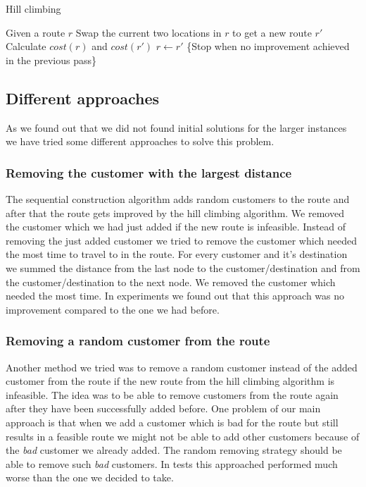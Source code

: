 \documentclass[fleqn]{scrartcl}
\begin{document}
\begin{algorithm}
\caption{Hill climbing}
\label{algo:hillclimb}
\begin{algorithmic}[1]
\State Given a route $r$
\Repeat
{}
\State Swap the current two locations in $r$ to get a new route $r'$
\State Calculate $cost(r)$ and $cost(r')$
\State $r \gets r'$
\EndIf
\EndIf
\EndFor
{} \{Stop when no improvement achieved in the previous pass\}
\end{algorithmic}
\end{algorithm}

\subsection{Different approaches}

As we found out that we did not found initial solutions for the larger instances we have tried some different approaches to solve this problem.

\subsubsection{Removing the customer with the largest distance}
The sequential construction algorithm adds random customers to the route and after that the route gets improved by the hill climbing algorithm. We removed the customer which we had just added if the new route is infeasible. Instead of removing the just added customer we tried to remove the customer which needed the most time to travel to in the route. For every customer and it's destination we summed the distance from the last node to the customer/destination and from the customer/destination to the next node. We removed the customer which needed the most time. In experiments we found out that this approach was no improvement compared to the one we had before.

\subsubsection{Removing a random customer from the route}
Another method we tried was to remove a random customer instead of the added customer from the route if the new route from the hill climbing algorithm is infeasible. The idea was to be able to remove customers from the route again after they have been successfully added before. One problem of our main approach is that when we add a customer which is bad for the route but still results in a feasible route we might not be able to add other customers because of the \textit{bad} customer we already added. The random removing strategy should be able to remove such \textit{bad} customers. In tests this approached performed much worse than the one we decided to take.
\end{document}
